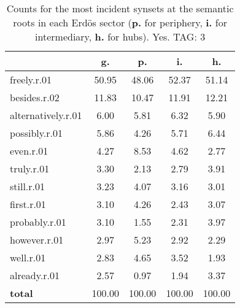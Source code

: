 \begin{table}[h!]
\begin{center}
\begin{tabular}{| l || c | c | c | c |}\hline
 & {\bf g.} & {\bf p.} & {\bf i.} & {\bf h.} \\\hline\hline
freely.r.01 & 50.95  & 48.06  & 52.37  & 51.14 \\\hline
besides.r.02 & 11.83  & 10.47  & 11.91  & 12.21 \\\hline
alternatively.r.01 & 6.00  & 5.81  & 6.32  & 5.90 \\\hline
possibly.r.01 & 5.86  & 4.26  & 5.71  & 6.44 \\\hline
even.r.01 & 4.27  & 8.53  & 4.62  & 2.77 \\\hline
truly.r.01 & 3.30  & 2.13  & 2.79  & 3.91 \\\hline
still.r.01 & 3.23  & 4.07  & 3.16  & 3.01 \\\hline
first.r.01 & 3.10  & 4.26  & 2.43  & 3.07 \\\hline
probably.r.01 & 3.10  & 1.55  & 2.31  & 3.97 \\\hline
however.r.01 & 2.97  & 5.23  & 2.92  & 2.29 \\\hline
well.r.01 & 2.83  & 4.65  & 3.52  & 1.93 \\\hline
already.r.01 & 2.57  & 0.97  & 1.94  & 3.37 \\\hline\hline
{{\bf total}} & 100.00  & 100.00  & 100.00  & 100.00 \\\hline
\end{tabular}
\caption{Counts for the most incident synsets at the semantic roots in each Erd\"os sector ({\bf p.} for periphery, {\bf i.} for intermediary, {\bf h.} for hubs). Yes. TAG: 3}
\end{center}
\end{table}